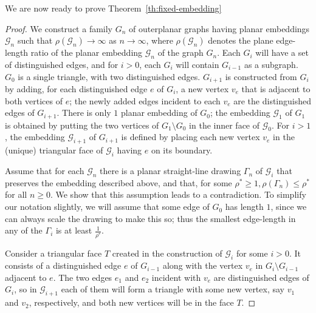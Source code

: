 \documentclass[orivec]{llncs}
\begin{document}
We are now ready to prove Theorem~\ref{th:fixed-embedding}
\begin{proof}
We construct a family $G_n$ of  outerplanar graphs having planar embeddings $\mathcal{G}_n$ such that $\rho(\mathcal{G}_n) \rightarrow \infty$ as $n \rightarrow \infty$, where
 $\rho(\mathcal{G}_n)$ denotes the plane edge-length ratio of the planar embedding
 $\mathcal{G}_n$ of the graph $G_n$.
Each $G_i$ will have a set of distinguished edges, and for $i > 0$, each $G_i$ will contain $G_{i-1}$ as a subgraph.
$G_0$ is a single triangle, with two distinguished edges. $G_{i+1}$ is constructed from $G_i$ by adding, for each distinguished edge $e$ of $G_i$, a new vertex $v_e$ that is adjacent to both vertices of $e$; the newly added edges incident to each $v_e$ are the distinguished edges of $G_{i+1}$.
There is only $1$ planar embedding of $G_0$; the embedding $\mathcal{G}_1$ of $G_1$
is obtained by putting the two vertices of $G_1 \setminus G_0$ in the inner face of $\mathcal{G}_0$.
For $i > 1$, the embedding $\mathcal{G}_{i+1}$ of $G_{i+1}$ is defined by placing each new vertex $v_e$ in the (unique) triangular face of $\mathcal{G}_i$ having $e$ on its boundary.

Assume that for each $\mathcal{G}_n$ there is a planar straight-line drawing $\Gamma_n$ of
$\mathcal{G}_i$ that preserves the embedding described above, and that, for some
$\rho^* \geq 1, \rho(\Gamma_n) \leq \rho^*$ for all $n \geq 0$.
We show that this assumption leads to a contradiction.
To simplify our notation slightly, we will assume that some edge of $G_0$ has length
$1$, since we can always scale the drawing to make this so;
thus the smallest edge-length in any of the $\Gamma_i$ is at least $\frac{1}{\rho^*}$.

Consider a triangular face $T$ created in the construction of $\mathcal{G}_i$ for some $i>0$.
It consists of a distinguished edge $e$ of $G_{i-1}$ along with the vertex $v_e$ in
$G_i \setminus G_{i-1}$ adjacent to $e$.
The two edges  $e_1$ and $e_2$ incident with $v_e$ are distinguished edges of $G_i$, so in
$\mathcal{G}_{i+1}$ each
of them will form a triangle with some new vertex, say $v_1$ and $v_2$, respectively, and both new vertices will be in the face $T$.


\end{proof}
\end{document}

